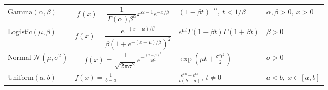 \begin{longtable}{|p{2.5cm}|p{5.5cm}|p{4.5cm}|p{3.0cm}|}
\( \text{Gamma}(\alpha, \beta) \) & \[ f(x) = \frac{1}{\Gamma(\alpha)\beta^\alpha} x^{\alpha-1} e^{-x/\beta} \] & \( (1 - \beta t)^{-\alpha},\ t < 1/\beta \) & \( \alpha, \beta > 0,\ x > 0 \) \\
\hline

\( \text{Logistic}(\mu, \beta) \) & \[ f(x) = \frac{e^{-(x - \mu)/\beta}}{\beta(1 + e^{-(x - \mu)/\beta})^2} \] & \(e^{\mu t}\Gamma(1 - \beta t) \Gamma(1 + \beta t) \)& \( \beta > 0 \) \\
\hline

Normal \( \mathcal{N}(\mu, \sigma^2) \) & \[ f(x) = \frac{1}{\sqrt{2\pi \sigma^2}} e^{-\frac{(x - \mu)^2}{2\sigma^2}} \] & \( \exp\left( \mu t + \frac{\sigma^2 t^2}{2} \right) \) & \( \sigma > 0 \) \\
\hline

\( \text{Uniform}(a, b) \) & \( f(x) = \frac{1}{b - a}\) & \( \frac{e^{tb} - e^{ta}}{t(b - a)} \), \( t \neq 0 \) & \( a < b,\ x \in [a,b]  \) \\
\hline
\end{longtable}\label{t: MGF_Appendix}